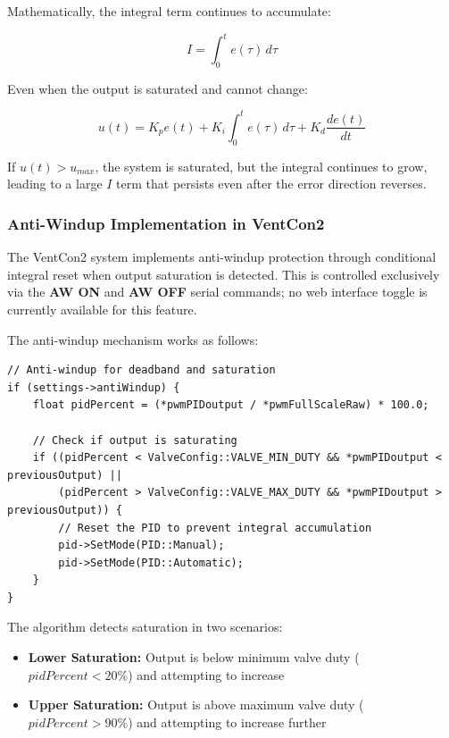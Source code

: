 Mathematically, the integral term continues to accumulate:

\begin{equation}
I = \int_0^t e(\tau) \, d\tau
\end{equation}

Even when the output is saturated and cannot change:

\begin{equation}
u(t) = K_p e(t) + K_i \int_0^t e(\tau) \, d\tau + K_d \frac{de(t)}{dt}
\end{equation}

If $u(t) > u_{max}$, the system is saturated, but the integral continues to grow, leading to a large $I$ term that persists even after the error direction reverses.

\subsubsection{Anti-Windup Implementation in VentCon2}
The VentCon2 system implements anti-windup protection through conditional integral reset when output saturation is detected. This is controlled exclusively via the \textbf{AW ON} and \textbf{AW OFF} serial commands; no web interface toggle is currently available for this feature.

The anti-windup mechanism works as follows:

\begin{lstlisting}[caption=Anti-Windup Logic from ControlSystem.cpp]
// Anti-windup for deadband and saturation
if (settings->antiWindup) {
    float pidPercent = (*pwmPIDoutput / *pwmFullScaleRaw) * 100.0;
    
    // Check if output is saturating
    if ((pidPercent < ValveConfig::VALVE_MIN_DUTY && *pwmPIDoutput < previousOutput) ||
        (pidPercent > ValveConfig::VALVE_MAX_DUTY && *pwmPIDoutput > previousOutput)) {
        // Reset the PID to prevent integral accumulation
        pid->SetMode(PID::Manual);
        pid->SetMode(PID::Automatic);
    }
}
\end{lstlisting}

The algorithm detects saturation in two scenarios:

\begin{itemize}
    \item \textbf{Lower Saturation:} Output is below minimum valve duty ($pidPercent < 20\%$) and attempting to increase
    \item \textbf{Upper Saturation:} Output is above maximum valve duty ($pidPercent > 90\%$) and attempting to increase further
\end{itemize}

